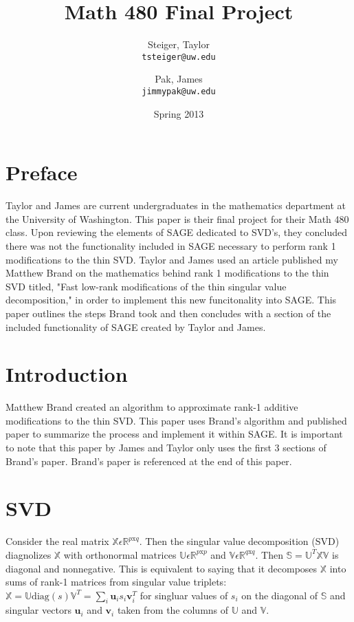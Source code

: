\documentclass{article}
\begin{document}
\title{Math 480 Final Project}
\author{
  Steiger, Taylor\\
  \texttt{tsteiger@uw.edu}
  \and
  Pak, James\\
  \texttt{jimmypak@uw.edu}
}
\date{Spring 2013}
\maketitle

\newpage
\tableofcontents
\newpage

\section{Preface\label{intro}}
Taylor and James are current undergraduates in the mathematics department at the University of Washington. This paper is their final project for their Math 480 class. Upon reviewing the elements of SAGE dedicated to SVD's, they concluded there was not the functionality included in SAGE necessary to perform rank 1 modifications to the thin SVD. Taylor and James used an article published my Matthew Brand on the mathematics behind rank 1 modifications to the thin SVD titled, "Fast low-rank modiﬁcations of the thin singular value decomposition," in order to implement this new funcitonality into SAGE. This paper outlines the steps Brand took and then concludes with a section of the included functionality of SAGE created by Taylor and James.

\section{Introduction\label{intro}}
Matthew Brand created an algorithm to approximate rank-1 additive modifications to the thin SVD. This paper uses Brand's algorithm and published paper to summarize the process and implement it within SAGE. It is important to note that this paper by James and Taylor only uses the first 3 sections of Brand's paper. Brand's paper is referenced at the end of this paper.


\section{SVD\label{svd}}
Consider the real matrix $\mathds{X}{\epsilon}{\mathds{R}^{p\mathrm{x}q}}$.
Then the singular value decomposition (SVD) diagnolizes $\mathds{X}$ with orthonormal matrices $\mathds{U}\epsilon \mathds{R}^{p\mathrm{x}p}$ and $\mathds{V} \epsilon \mathds{R}\label{R}^{q\mathrm{x}q}$.
Then $\mathds{S}=\mathds{U}^T\mathds{X}\mathds{V}$ is diagonal and nonnegative. This is equivalent to saying that it decomposes $\mathds{X}$ into sums of rank-1 matrices from singular value triplets: $\mathds{X} = \mathds{U}\mathrm{diag}{(s)}\mathds{V}^T = \sum_{i} \mathbf{u}_{i} s_{i} \mathbf{v}_{i}^T$ for singluar values of $s_{i}$ on the diagonal of $\mathds{S}$ and singular vectors $\mathbf{u}_{i}$ and $\mathbf{v}_{i}$ taken from the columns of $\mathds{U}$ and $\mathds{V}$.
\end{document}
